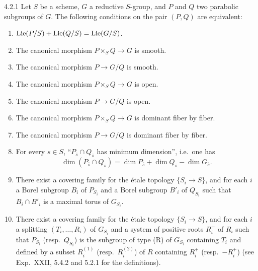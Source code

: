 \begin{theorem}{4.2.1}\label{XXVI.4.2.1}
Let $S$ be a scheme, $G$ a reductive $S$-group, and $P$ and $Q$ two parabolic subgroups of $G$. The following conditions on the pair $(P,Q)$ are equivalent:
\begin{enumerate}[label={},leftmargin=2.8em]
\item[(i)] $\operatorname{Lie}(P/S)+\operatorname{Lie}(Q/S)=\operatorname{Lie}(G/S)$.
\item[(ii)] The canonical morphism $P\times_S Q\to G$ is smooth.
\item[(ii$'$)] The canonical morphism $P\to G/Q$ is smooth.
\item[(iii)] The canonical morphism $P\times_S Q\to G$ is open.
\item[(iii$'$)] The canonical morphism $P\to G/Q$ is open.
\item[(iv)] The canonical morphism $P\times_S Q\to G$ is dominant fiber by fiber.
\item[(iv$'$)] The canonical morphism $P\to G/Q$ is dominant fiber by fiber.
\item[(v)] For every $s\in S$, ``$P_{\overline s}\cap Q_{\overline s}$ has minimum dimension'', i.e.~one has
\[
\dim(P_{\overline s}\cap Q_{\overline s})=\dim P_{\overline s}+\dim Q_{\overline s}-\dim G_{\overline s}.
\]
\item[(vi)] There exist a covering family for the \'etale topology $\{S_i\to S\}$, and for each $i$ a Borel subgroup $B_i$ of $P_{S_i}$ and a Borel subgroup $B'_i$ of $Q_{S_i}$ such that $B_i\cap B'_i$ is a maximal torus of $G_{S_i}$.
\item[(vii)] There exist a covering family for the \'etale topology $\{S_i\to S\}$, and for each $i$ a splitting $(T_i,\ldots,R_i)$ of $G_{S_i}$ and a system of positive roots $R_i^+$ of $R_i$ such that $P_{S_i}$ (resp.~$Q_{S_i}$) is the subgroup of type (R) of $G_{S_i}$ containing $T_i$ and defined by a subset $R_i^{(1)}$ (resp.~$R_i^{(2)}$) of $R$ containing $R_i^+$ (resp.~$-R_i^+$) (see Exp.~XXII, 5.4.2 and 5.2.1 for the definitions).
\end{enumerate}
\end{theorem}

